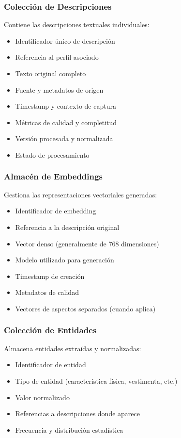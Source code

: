 \documentclass[12pt,a4paper]{article}
\begin{document}
\subsubsection{Colección de Descripciones}
Contiene las descripciones textuales individuales:

\begin{itemize}
    \item Identificador único de descripción
    \item Referencia al perfil asociado
    \item Texto original completo
    \item Fuente y metadatos de origen
    \item Timestamp y contexto de captura
    \item Métricas de calidad y completitud
    \item Versión procesada y normalizada
    \item Estado de procesamiento
\end{itemize}

\subsubsection{Almacén de Embeddings}
Gestiona las representaciones vectoriales generadas:

\begin{itemize}
    \item Identificador de embedding
    \item Referencia a la descripción original
    \item Vector denso (generalmente de 768 dimensiones)
    \item Modelo utilizado para generación
    \item Timestamp de creación
    \item Metadatos de calidad
    \item Vectores de aspectos separados (cuando aplica)
\end{itemize}

\subsubsection{Colección de Entidades}
Almacena entidades extraídas y normalizadas:

\begin{itemize}
    \item Identificador de entidad
    \item Tipo de entidad (característica física, vestimenta, etc.)
    \item Valor normalizado
    \item Referencias a descripciones donde aparece
    \item Frecuencia y distribución estadística
\end{itemize}
\end{document}
